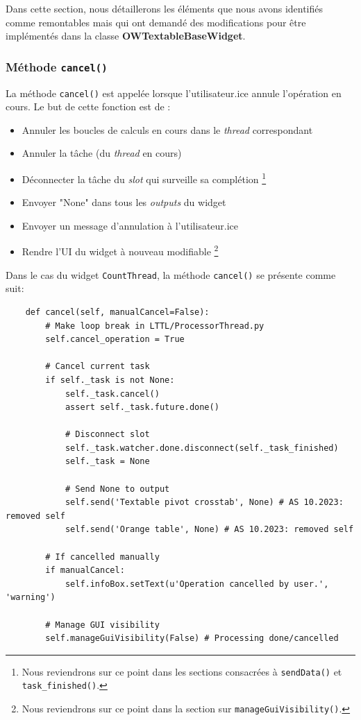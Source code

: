 \documentclass{article}
\begin{document}
Dans cette section, nous détaillerons les éléments que nous avons identifiés comme remontables mais qui ont demandé des modifications pour être implémentés dans la classe \textbf{OWTextableBaseWidget}.

\subsubsection{Méthode \texttt{cancel()}}

La méthode \texttt{cancel()} est appelée lorsque l'utilisateur.ice annule l'opération en cours. Le but de cette fonction est de :
\vspace{5mm}
\begin{itemize}
    \item Annuler les boucles de calculs en cours dans le \textit{thread} correspondant
    \item Annuler la tâche (du \textit{thread} en cours)
    \item Déconnecter la tâche du \textit{slot} qui surveille sa complétion \footnote{Nous reviendrons sur ce point dans les sections consacrées à \texttt{sendData()} et \texttt{task\_finished()}.}
    \item Envoyer "None" dans tous les \textit{outputs} du widget
    \item Envoyer un message d'annulation à l'utilisateur.ice
    \item Rendre l'UI du widget à nouveau modifiable \footnote{Nous reviendrons sur ce point dans la section sur \texttt{manageGuiVisibility()}.}
\end{itemize}

Dans le cas du widget \texttt{CountThread}, la méthode \texttt{cancel()} se présente comme suit:

\begin{verbatim}
    def cancel(self, manualCancel=False):
        # Make loop break in LTTL/ProcessorThread.py 
        self.cancel_operation = True

        # Cancel current task
        if self._task is not None:
            self._task.cancel()
            assert self._task.future.done()
            
            # Disconnect slot
            self._task.watcher.done.disconnect(self._task_finished)
            self._task = None
            
            # Send None to output 
            self.send('Textable pivot crosstab', None) # AS 10.2023: removed self
            self.send('Orange table', None) # AS 10.2023: removed self

        # If cancelled manually
        if manualCancel:
            self.infoBox.setText(u'Operation cancelled by user.', 'warning')

        # Manage GUI visibility
        self.manageGuiVisibility(False) # Processing done/cancelled
\end{verbatim}
\end{document}
